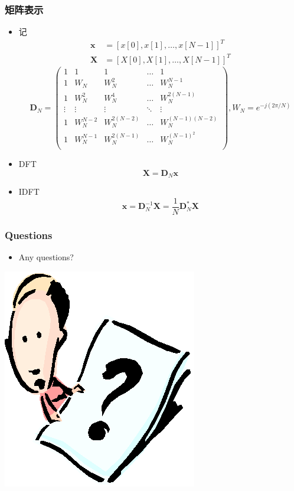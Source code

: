 \documentclass[CJKutf8,dvipsnames,table]{beamer}
\begin{document}
\begin{CJK*}{UTF8}{song}
  \begin{frame}
    \frametitle{矩阵表示}
    \begin{itemize}
	\item 记
	\begin{align*}
		\mathbf{x} & =[x[0], x[1], \hdots, x[N-1]]^T \\
		\mathbf{X} & =[X[0], X[1], \hdots, X[N-1]]^T
	\end{align*}
	\[
	\mathbf{D}_N=
    \begin{pmatrix}
1      & 1   & 1     & \hdots & 1 \\
1      & W_N & W_N^2 & \hdots & W_N^{N-1} \\
1      & W_N^2 & W_N^4 & \hdots & W_N^{2(N-1)} \\
\vdots & \vdots & \vdots  & \ddots & \vdots \\
1      & W_N^{N-2} & W_N^{2(N-2)} & \hdots & W_N^{(N-1)(N-2)} \\
1      & W_N^{N-1} & W_N^{2(N-1)} & \hdots & W_N^{(N-1)^2} \\

	\end{pmatrix}
	, W_N  = e^{-j(2\pi/N)}
	\]	
	\item DFT
	\[
		\mathbf{X}=\mathbf{D}_N \mathbf{x}
	\]
	\item IDFT
	\[
		\mathbf{x}=\mathbf{D}_N^{-1} \mathbf{X}=\frac{1}{N}\mathbf{D}_N^{*} \mathbf{X}
	\]
	\end{itemize}
  \end{frame}

  \begin{frame}
    \frametitle{Questions}
    \begin{itemize}
    \item Any questions?
    \end{itemize}
    \begin{center}
      \includegraphics[scale=.5]{question}
    \end{center}
  \end{frame} 


\end{CJK*}
\end{document}
